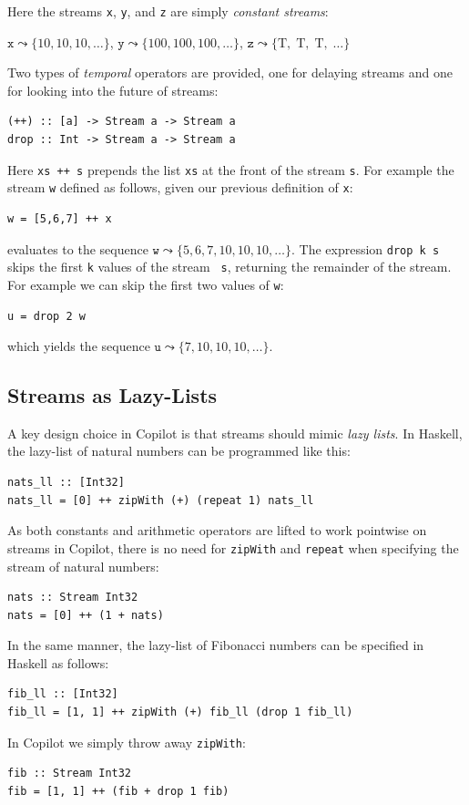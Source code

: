 \noindent Here the streams {\tt x}, {\tt y}, and {\tt z} are simply
\emph{constant streams}:

\begin{center}
$\mathtt{x} \leadsto \{10, 10, 10, \dots \}$,
$\mathtt{y} \leadsto \{100, 100, 100,  \dots \}$,
$\mathtt{z} \leadsto \{\mbox{T},\; \mbox{T},\; \mbox{T},\; \dots \}$
\end{center}

Two types of \emph{temporal} operators are provided, one for delaying streams and one for
looking into the future of streams:
%
\begin{lstlisting}[language = Copilot, frame = single]
(++) :: [a] -> Stream a -> Stream a
drop :: Int -> Stream a -> Stream a
\end{lstlisting}
%
Here {\tt xs ++ s} prepends the list {\tt xs} at the front of the stream {\tt s}.
For example the stream {\tt w} defined as follows, given our previous definition
of {\tt x}:
%
\begin{lstlisting}[language = Copilot, frame = single]
w = [5,6,7] ++ x
\end{lstlisting}
%
evaluates to the sequence
$\mathtt{w} \leadsto \{5, 6, 7, 10, 10, 10, \dots\}$.
The expression {\tt drop k s} skips the first {\tt k} values of the stream {\tt
  s}, returning the remainder of the stream.  
For example we can skip the first two values of {\tt w}:
%
\begin{lstlisting}[language = Copilot, frame = single]
u = drop 2 w
\end{lstlisting}
%
which yields the sequence
$\mathtt{u} \leadsto \{7, 10, 10, 10, \dots\}$.

\subsection{Streams as Lazy-Lists} \label{sec:stream}

A key design choice in Copilot is that streams should mimic \emph{lazy lists}.
In Haskell, the lazy-list of natural numbers can be programmed like this:
%
\begin{lstlisting}[language = Copilot, frame = single]
nats_ll :: [Int32]
nats_ll = [0] ++ zipWith (+) (repeat 1) nats_ll
\end{lstlisting}
%
As both constants and arithmetic operators are lifted to work pointwise on
streams in Copilot, there is no need for {\tt zipWith} and {\tt repeat} when
specifying the stream of natural numbers:
%
\begin{lstlisting}[language = Copilot, frame = single]
nats :: Stream Int32
nats = [0] ++ (1 + nats)
\end{lstlisting}
%
In the same manner, the lazy-list of Fibonacci numbers can be specified  in Haskell as follows:
%
\begin{lstlisting}[language = Copilot, frame = single]
fib_ll :: [Int32]
fib_ll = [1, 1] ++ zipWith (+) fib_ll (drop 1 fib_ll)
\end{lstlisting}
%
In Copilot we simply throw away {\tt zipWith}:
\begin{lstlisting}[language = Copilot, frame = single]
fib :: Stream Int32
fib = [1, 1] ++ (fib + drop 1 fib)
\end{lstlisting}

